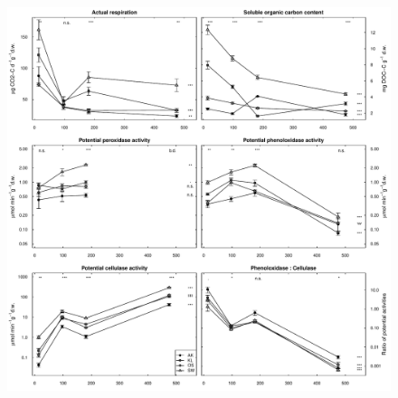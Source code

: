 \documentclass[10pt]{article}
\begin{document}
\begin{flushleft}
\newpage
\begin{figure}[!ht]
\begin{center}
\includegraphics{ligpaper-enz}
\end{center}
\end{figure}


\end{flushleft}
\end{document}
